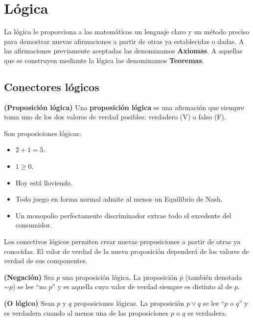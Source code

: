 
\section{Lógica}

La lógica le proporciona a las matemáticas un lenguaje claro y un método preciso para demostrar nuevas afirmaciones a partir de otras ya establecidas o dadas. A las afirmaciones previamente aceptadas las denominamos \textbf{Axiomas}. A aquellas que se construyen mediante la lógica las denominamos \textbf{Teoremas}. 

\subsection{Conectores lógicos}

\begin{definicion}
	\textbf{(Proposición lógica)}
	Una \textbf{proposición lógica} es una afirmación que siempre toma uno de los dos valores de verdad posibles: verdadero (V) o falso (F). 
\end{definicion}

\begin{ejemplo}
	Son proposiciones lógicas: 
	\begin{itemize}
		\item $2+1 = 5$. 
		\item $1 \geq 0$.
		\item Hoy está lloviendo. 
		\item Todo juego en forma normal admite al menos un Equilibrio de Nash.   
		\item Un monopolio perfectamente discriminador extrae todo el excedente del consumidor. 
	\end{itemize}
\end{ejemplo}

Los conectivos lógicos permiten crear nuevas proposiciones a partir de otras ya conocidas. El valor de verdad de la nueva proposición dependerá de los valores de verdad de sus componentes. 

\begin{definicion}
	\textbf{(Negación)} 
	Sea $p$ una proposición lógica. La proposición $\overline{p}$ (también denotada $\sim p$) se lee ``no $p$'' y es aquella cuyo valor de verdad siempre es distinto al de $p$. 
\end{definicion}

\begin{definicion}
	\textbf{(O lógico)}	
	Sean $p$ y $q$ proposiciones lógicas. La proposición $p \vee q$ se lee ``$p$ o $q$'' y es verdadera cuando al menos una de las proposiciones $p$ o $q$ es verdadera. 
\end{definicion}

